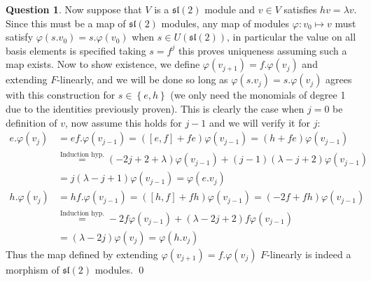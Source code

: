\documentclass[10.5pt]{article}
\theoremstyle{definition}
\newtheorem{pb}{Question}
\numberwithin{example}{subsection}
\numberwithin{proposition}{subsection}
\newcommand{\set}[1]{\left\{#1\right\}}
\begin{document}
\begin{pb}
        Now suppose that \(V\) is a \(\mathfrak{sl}(2)\) module and \(v \in V\) satisfies \(hv = \lambda v\). Since this must be a map of \(\mathfrak{sl}(2)\) modules, any map of modules \(\varphi:v_0 \mapsto v\) must satisfy \(\varphi(s.v_0) = s.\varphi(v_0)\) when \(s \in U(\mathfrak{sl}(2))\), in particular the value on all basis elements is specified taking \(s = f^j\) this proves uniqueness assuming such a map exists. Now to show existence, we define \(\varphi(v_{j+1}) = f.\varphi(v_j)\) and extending \(F\)-linearly, and we will be done so long as \(\varphi(s.v_j) = s. \varphi(v_j)\) agrees with this construction for \(s \in \set{e,h}\) (we only need the monomials of degree 1 due to the identities previously proven). This is clearly the case when \(j = 0\) be definition of \(v\), now assume this holds for \(j-1\) and we will verify it for \(j\):
        \begin{align}
            e.\varphi(v_j) &= ef. \varphi(v_{j-1}) = ([e,f] + fe) \varphi(v_{j-1}) = (h + fe) \varphi(v_{j-1})\\
            &\overset{\text{Induction hyp.}}{=} (-2j + 2 + \lambda) \varphi(v_{j-1}) + (j-1)(\lambda-j+2)\varphi(v_{j-1}) \\
            &= j(\lambda-j+1) \varphi(v_{j-1}) = \varphi(e.v_j) \\
            h.\varphi(v_j) &= hf.\varphi(v_{j-1}) = ([h,f] + fh)\varphi(v_{j-1}) = (-2f + fh)\varphi(v_{j-1}) \\
            &\overset{\text{Induction hyp.}}{=} -2f \varphi(v_{j-1}) + (\lambda- 2j + 2)f \varphi(v_{j-1}) \\
            &= (\lambda - 2j) \varphi(v_{j}) = \varphi(h.v_j)
        \end{align}
        Thus the map defined by extending \(\varphi(v_{j+1}) = f.\varphi(v_j)\) \(F\)-linearly is indeed a morphism of \(\mathfrak{sl}(2)\) modules. \qed
    \end{pb}
\end{document}
